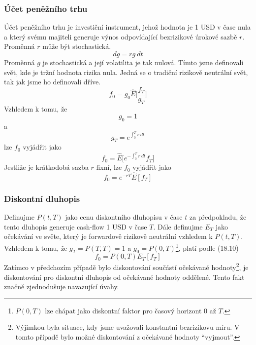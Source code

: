 \documentclass[a4paper]{book}
\begin{document}
\subsubsection{Účet peněžního trhu}

Účet peněžního trhu je investiční instrument, jehož hodnota je 1 USD v čase nula a který svému majiteli generuje výnos odpovídající bezrizikové úrokové sazbě $r$. Proměnná $r$ může být stochastická.
\begin{equation*}
dg = r g\ dt
\end{equation*}
Proměnná $g$ je stochastická a její volatilita je tak nulová. Tímto jsme definovali svět, kde je tržní hodnota rizika nula. Jedná se o tradiční rizikově neutrální svět, tak jak jsme ho definovali dříve.
\begin{equation*}
f_0 = g_0 \hat{E} \Bigg[ \frac{f_T}{g_T} \Bigg]
\end{equation*}
Vzhledem k tomu, že
\begin{equation*}
g_0 = 1
\end{equation*}
a
\begin{equation*}
g_T = e^{\int^T_0 r\ dt}
\end{equation*}
lze $f_0$ vyjádřit jako
\begin{equation*}
f_0 = \hat{E}\Big[ e^{- \int^T_0 r\ dt} f_T \Big]
\end{equation*}
Jestliže je krátkodobá sazba $r$ fixní, lze $f_0$ vyjádřit jako
\begin{equation*}
f_0 = e^{-rT}\hat{E}[f_T]
\end{equation*}

\subsubsection{Diskontní dluhopis}

Definujme $P(t,T)$ jako cenu diskontního dluhopisu v čase $t$ za předpokladu, že tento dluhopis generuje cash-flow 1 USD v čase $T$. Dále definujme $E_T$ jako očekávání ve světe, který je forwardově rizikově neutrální vzhledem k $P(t,T)$. Vzhledem k tomu, že $g_T = P(T,T) = 1$ a $g_0 = P(0,T)$\footnote{$P(0,T)$ lze chápat jako diskontní faktor pro časový horizont 0 až $T$.}, platí podle (18.10)
\begin{equation*}
f_0 = P(0,T)E_T[f_T]
\end{equation*}
Zatímco v předchozím případě bylo diskontování součástí očekávané hodnoty\footnote{Výjimkou byla situace, kdy jsme uvažovali konstantní bezrizikovu míru. V tomto případě bylo možné diskontování z očekávané hodnoty ``vyjmout''.}, je diskontování pro diskontní dluhopis od očekávané hodnoty oddělené. Tento fakt značně zjednodušuje navazující úvahy.
\end{document}
